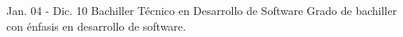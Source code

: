 \documentclass[]{cv-class}
\begin{document}
\begin{entrylist}
	\entry
	{Jan. 04 - Dic. 10}
	{Bachiller Técnico en Desarrollo de Software}
	{}
	{Grado de bachiller con énfasis en desarrollo de software.}
	

\end{entrylist}
\end{document}
